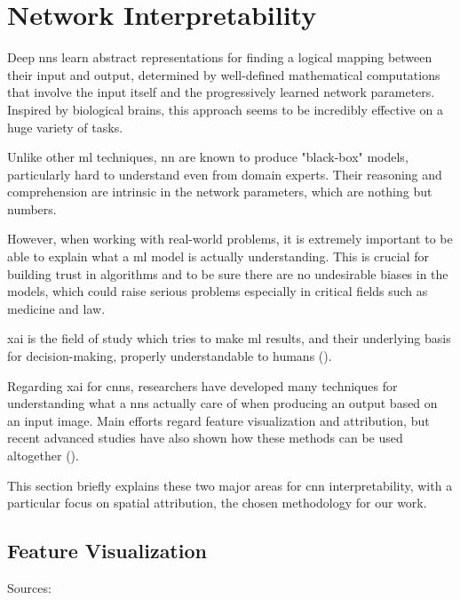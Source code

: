 \section{Network Interpretability}
\label{sec:network-interpretability}


Deep \gls{nn}s learn abstract representations for finding a logical mapping between their input and output, determined by well-defined mathematical computations that involve the input itself and the progressively learned network parameters. Inspired by biological brains, this approach seems to be incredibly effective on a huge variety of tasks.

Unlike other \gls{ml} techniques, \gls{nn} are known to produce "black-box" models, particularly hard to understand even from domain experts. Their reasoning and comprehension are intrinsic in the network parameters, which are nothing but numbers.

\medskip 

However, when working with real-world problems, it is extremely important to be able to explain what a \gls{ml} model is actually understanding. This is crucial for building trust in algorithms and to be sure there are no undesirable biases in the models, which could raise serious problems especially in critical fields such as medicine and law.

\gls{xai} is the field of study which tries to make \gls{ml} results, and their underlying basis for decision-making, properly understandable to humans (\cite{xai-wiki}). 

\medskip 

Regarding \gls{xai} for \gls{cnn}s, researchers have developed many techniques for understanding what a \gls{nn}s actually care of when producing an output based on an input image. Main efforts regard feature visualization and attribution, but recent advanced studies have also shown how these methods can be used altogether (\cite{olah2018the}).

This section briefly explains these two major areas for \gls{cnn} interpretability, with a particular focus on spatial attribution, the chosen methodology for our work.



\subsection{Feature Visualization}

Sources: \cite{olah2017feature}



